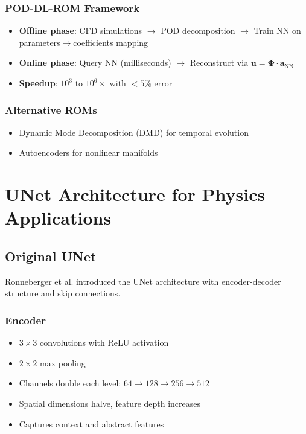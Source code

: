 \subsection{POD-DL-ROM Framework}
\begin{itemize}
    \item \textbf{Offline phase}: CFD simulations $\rightarrow$ POD decomposition $\rightarrow$ Train NN on parameters$\rightarrow$coefficients mapping
    \item \textbf{Online phase}: Query NN (milliseconds) $\rightarrow$ Reconstruct via $\mathbf{u} = \boldsymbol{\Phi} \cdot \mathbf{a}_{\text{NN}}$
    \item \textbf{Speedup}: $10^3$ to $10^6\times$ with $<5\%$ error
\end{itemize}

\subsection{Alternative ROMs}
\begin{itemize}
    \item Dynamic Mode Decomposition (DMD) for temporal evolution
    \item Autoencoders for nonlinear manifolds
\end{itemize}

\chapter{UNet Architecture for Physics Applications}

\section{Original UNet}

Ronneberger et al. \cite{ronneberger2015} introduced the UNet architecture with encoder-decoder structure and skip connections.

\subsection{Encoder}
\begin{itemize}
    \item $3 \times 3$ convolutions with ReLU activation
    \item $2 \times 2$ max pooling
    \item Channels double each level: $64 \rightarrow 128 \rightarrow 256 \rightarrow 512$
    \item Spatial dimensions halve, feature depth increases
    \item Captures context and abstract features
\end{itemize}

